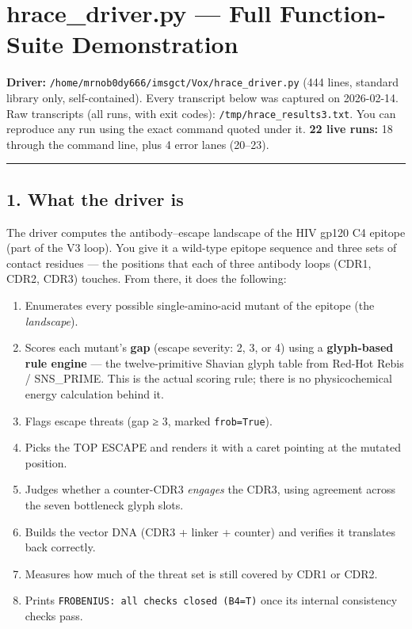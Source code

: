 \hypertarget{hrace_driver.py-full-function-suite-demonstration}{%
\section{hrace\_driver.py --- Full Function-Suite
Demonstration}\label{hrace_driver.py-full-function-suite-demonstration}}

\textbf{Driver:} \texttt{/home/mrnob0dy666/imsgct/Vox/hrace\_driver.py}
(444 lines, standard library only, self-contained). Every transcript
below was captured on 2026-02-14. Raw transcripts (all runs, with exit
codes): \texttt{/tmp/hrace\_results3.txt}. You can reproduce any run
using the exact command quoted under it. \textbf{22 live runs:} 18
through the command line, plus 4 error lanes (20--23).

\begin{center}\rule{0.5\linewidth}{0.5pt}\end{center}

\hypertarget{what-the-driver-is}{%
\subsection{1. What the driver is}\label{what-the-driver-is}}

The driver computes the antibody--escape landscape of the HIV gp120 C4
epitope (part of the V3 loop). You give it a wild-type epitope sequence
and three sets of contact residues --- the positions that each of three
antibody loops (CDR1, CDR2, CDR3) touches. From there, it does the
following:

\begin{enumerate}
\def\labelenumi{\arabic{enumi}.}
\tightlist
\item
  Enumerates every possible single-amino-acid mutant of the epitope (the
  \emph{landscape}).
\item
  Scores each mutant's \textbf{gap} (escape severity: 2, 3, or 4) using
  a \textbf{glyph-based rule engine} --- the twelve-primitive Shavian
  glyph table from Red-Hot Rebis / SNS\_PRIME. This is the actual
  scoring rule; there is no physicochemical energy calculation behind
  it.
\item
  Flags escape threats (gap ≥ 3, marked \texttt{frob=True}).
\item
  Picks the TOP ESCAPE and renders it with a caret pointing at the
  mutated position.
\item
  Judges whether a counter-CDR3 \emph{engages} the CDR3, using agreement
  across the seven bottleneck glyph slots.
\item
  Builds the vector DNA (CDR3 + linker + counter) and verifies it
  translates back correctly.
\item
  Measures how much of the threat set is still covered by CDR1 or CDR2.
\item
  Prints \texttt{FROBENIUS:\ all\ checks\ closed\ (B4=T)} once its
  internal consistency checks pass.
\end{enumerate}


